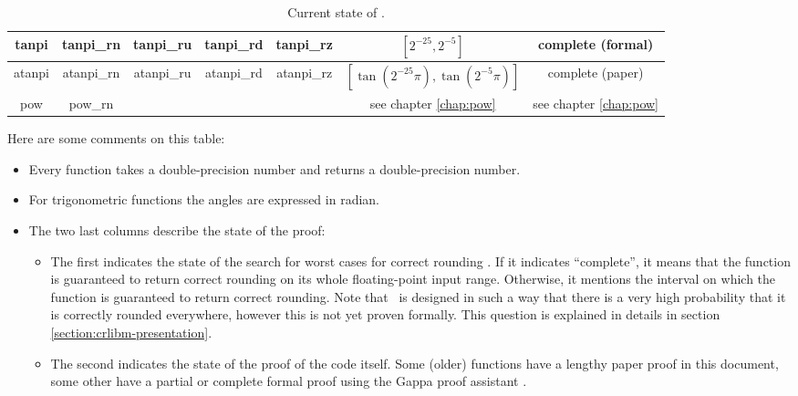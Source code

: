 \begin{table}[t]
\begin{center}
\begin{tabular}{|c|c|c|c|c||c|c|}
    tanpi & tanpi\_rn & tanpi\_ru & tanpi\_rd & tanpi\_rz & $[2^{-25},2^{-5}]$& complete (formal)\\ \hline
    atanpi & atanpi\_rn & atanpi\_ru & atanpi\_rd & atanpi\_rz & $[\tan(2^{-25}\pi),\tan(2^{-5}\pi)]$ & complete (paper)\\ \hline
    pow & pow\_rn &  &  &  & see chapter \ref{chap:pow} & see chapter \ref{chap:pow}\\ \hline
\end{tabular}
\end{center}

\caption{Current state of \crlibm.}
\label{tab:currentstate}
\end{table}

Here are some comments on this table:
\begin{itemize}
\item Every function takes a double-precision number and returns a
  double-precision number.
\item For trigonometric functions the angles are
  expressed in radian.
\item The two last columns describe the state of the
  proof:
  \begin{itemize}
  \item The first indicates the state of the search for worst cases
    for correct rounding \cite{LMT98,Lef2000}. If it indicates
    ``complete'', it means that the function is guaranteed to return
    correct rounding on its whole floating-point input range.
    Otherwise, it mentions the interval on which the function is
    guaranteed to return correct rounding. Note that \crlibm\ is
    designed in such a way that there is a very high probability that it
    is correctly rounded everywhere, however this is not yet proven
    formally. This question is explained in details in section
    \ref{section:crlibm-presentation}.

  \item The second indicates the state of the proof of the code
    itself. Some (older) functions have a lengthy paper proof in this
    document, some other have a partial or complete formal proof using
    the Gappa proof assistant \cite{Melqu05,DinLauMel2005}.
  \end{itemize}
\end{itemize}



